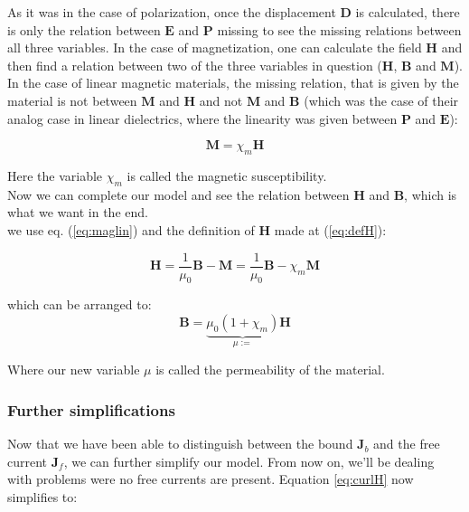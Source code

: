 As it was in the case of polarization, once the displacement $\textbf{D}$ is calculated, there is only the relation between $\textbf{E}$ and $\textbf{P}$ missing to see the missing relations between all three variables. In the case of magnetization, one can calculate the field $\textbf{H}$ and then find a relation between two of the three variables in question ($\textbf{H}$, $\textbf{B}$ and $\textbf{M}$). \\


In the case of linear magnetic materials, the missing relation, that is given by the material is not between $\textbf{M}$ and $\textbf{H}$ and not  $\textbf{M}$ and $\textbf{B}$ (which was the case of their analog case in linear dielectrics, where the linearity was given between $\textbf{P}$ and $\textbf{E}$):

\begin{equation}\label{eq:maglin}
\textbf{M} = \chi_m \textbf{H}
\end{equation}

Here the variable $\chi_m$ is called the magnetic susceptibility.\\

Now we can complete our model and see the relation between $\textbf{H}$ and $\textbf{B}$, which is what we want in the end.\\

we use eq. (\ref{eq:maglin}) and the definition of $\textbf{H}$ made at (\ref{eq:defH}):

\begin{equation}
\textbf{H} = \frac{1}{\mu_0}\textbf{B} - \textbf{M}  = \frac{1}{\mu_0}\textbf{B} - \chi_m\textbf{M} 
\end{equation}

which can be arranged to:
\begin{equation}
\textbf{B} = \underbrace{\mu_0(1+\chi_m)}_{\mu:=}\textbf{H}
\end{equation}

Where our new variable $\mu$ is called the permeability of the material.


\subsubsection{Further simplifications}
Now that we have been able to distinguish between the bound $\textbf{J}_b$ and the free current $\textbf{J}_f$, we can further simplify our model. From now on, we'll be dealing with problems were no free currents are present. Equation \ref{eq:curlH} now simplifies to:

